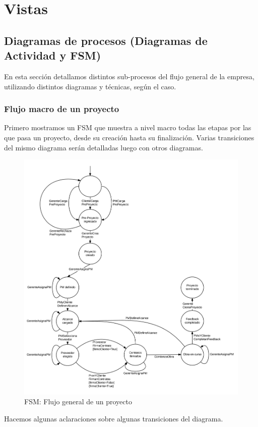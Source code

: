 \section{Vistas}




	\subsection{Diagramas de procesos (Diagramas de Actividad y FSM)}

En esta sección detallamos distintos sub-procesos del flujo general de la empresa, 
utilizando distintos diagramas y técnicas, según el caso. 

	\subsubsection{Flujo macro de un proyecto}
Primero mostramos un FSM que muestra a nivel macro todas las etapas por las 
que pasa un proyecto, desde su creación hasta su finalización. Varias transiciones 
del mismo diagrama serán detalladas luego con otros diagramas. 

\begin{figure}[H]
\centering
\includegraphics[width=0.8\linewidth]{diag/nuevos/fsm-proj.png}
\caption{FSM: Flujo general de un proyecto}
\label{fsm-proj}
\end{figure}

Hacemos algunas aclaraciones sobre algunas transiciones del diagrama.\\

